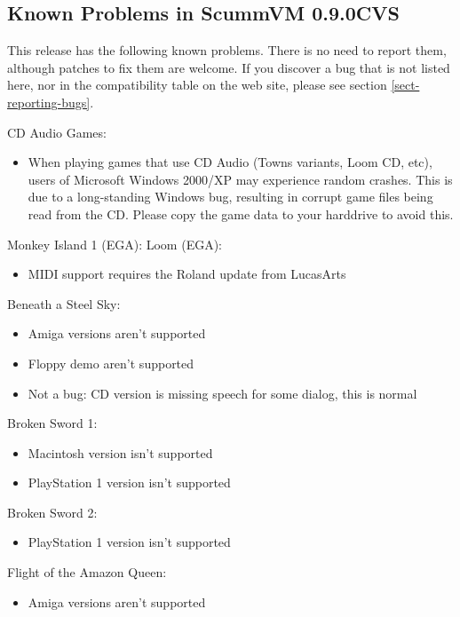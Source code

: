 

\subsection{Known Problems in ScummVM 0.9.0CVS}

This release has the following known problems. There is no need to report them,
although patches to fix them are welcome. If you discover a bug that is not
listed here, nor in the compatibility table on the web site, please see
section \ref{sect-reporting-bugs}.

CD Audio Games:
  \begin{itemize}
  \item When playing games that use CD Audio (Towns variants, Loom CD, etc),
                 users of Microsoft Windows 2000/XP may experience random crashes.
                 This is due to a long-standing Windows bug, resulting in corrupt
                 game files being read from the CD. Please copy the game data to
                 your harddrive to avoid this.
  \end{itemize}
Monkey Island 1 (EGA):
Loom (EGA):
  \begin{itemize}
  \item MIDI support requires the Roland update from LucasArts
  \end{itemize}
Beneath a Steel Sky:
  \begin{itemize}
  \item Amiga versions aren't supported
  \item Floppy demo aren't supported
  \item Not a bug: CD version is missing speech for some dialog, this is
                 normal
  \end{itemize}
Broken Sword 1:
  \begin{itemize}
  \item Macintosh version isn't supported
  \item PlayStation 1 version isn't supported
  \end{itemize}
Broken Sword 2:
  \begin{itemize}
  \item PlayStation 1 version isn't supported
  \end{itemize}
Flight of the Amazon Queen:
  \begin{itemize}
  \item Amiga versions aren't supported
  \end{itemize}
